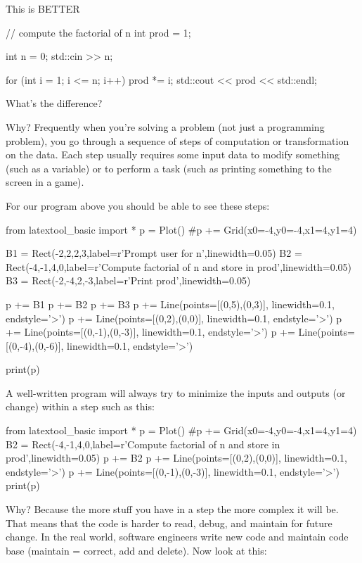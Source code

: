 This is BETTER

\begin{console}
// compute the factorial of n
int prod = 1;

int n = 0;
std::cin >> n;

for (int i = 1; i <= n; i++)
{    
     prod *= i;
}
std::cout << prod << std::endl;
\end{console}

\begin{ex} What's the difference?

Why? Frequently when you're solving a problem (not just a programming problem), you go through a sequence of steps of computation or transformation on the data. Each step usually requires some input data to modify something (such as a variable) or to perform a task (such as printing something to the screen in a game).
\end{ex}
For our program above you should be able to see these steps:

\begin{python}
from latextool_basic import *
p = Plot()
#p += Grid(x0=-4,y0=-4,x1=4,y1=4)

B1 = Rect(-2,2,2,3,label=r'Prompt user for n',linewidth=0.05)
B2 = Rect(-4,-1,4,0,label=r'Compute factorial of n and store in prod',linewidth=0.05)
B3 = Rect(-2,-4,2,-3,label=r'Print prod',linewidth=0.05)

p += B1
p += B2
p += B3
p += Line(points=[(0,5),(0,3)], linewidth=0.1, endstyle='>')
p += Line(points=[(0,2),(0,0)], linewidth=0.1, endstyle='>')
p += Line(points=[(0,-1),(0,-3)], linewidth=0.1, endstyle='>')
p += Line(points=[(0,-4),(0,-6)], linewidth=0.1, endstyle='>')

print(p)
\end{python}

A well-written program will always try to minimize the inputs and
outputs (or change) within a step such as this:
\begin{python}
from latextool_basic import *
p = Plot()
#p += Grid(x0=-4,y0=-4,x1=4,y1=4)
B2 = Rect(-4,-1,4,0,label=r'Compute factorial of n and store in prod',linewidth=0.05)
p += B2
p += Line(points=[(0,2),(0,0)], linewidth=0.1, endstyle='>')
p += Line(points=[(0,-1),(0,-3)], linewidth=0.1, endstyle='>')
print(p)
\end{python}

Why? Because the more stuff you have in a step the more complex it will be. That means that the code is harder to read, debug, and maintain for future change. In the real world, software engineers write new code and maintain code base (maintain = correct, add and delete). Now look at this:


